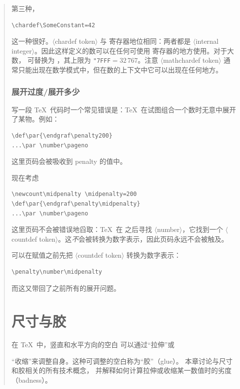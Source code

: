 \documentclass[a4paper]{rapport3}
\def\gr#1{$\langle$#1$\rangle$}\def\key#1{{\tt#1}}
\newenvironment{disp}{\begin{quotation}}{\end{quotation}}
\def\term#1\par{\index{#1}}
\begin{document}
\begin{disp}
第三种，
\begin{verbatim}
\chardef\SomeConstant=42
\end{verbatim}
这一种很好。\gr{chardef token} 与  寄存器地位相同：两者都是 \gr{internal integer}。因此这样定义的数可以在任何可使用  寄存器的地方使用。对于大数， 可替换为 ，其上限为 \verb>"7FFF>${}=32\,767$。注意 \gr{mathchardef token} 通常只能出现在数学模式中，但在数的上下文中它可以出现在任何地方。

\subsection{展开过度/展开多少}

写一段 \TeX\ 代码时一个常见错误是：\TeX\ 在试图组合一个数时无意中展开了某物。例如：
\begin{verbatim}
\def\par{\endgraf\penalty200}
...\par \number\pageno
\end{verbatim}
这里页码会被吸收到 penalty 的值中。

现在考虑
\begin{verbatim}
\newcount\midpenalty \midpenalty=200
\def\par{\endgraf\penalty\midpenalty}
...\par \number\pageno
\end{verbatim}
这里页码不会被错误地舀取：\TeX\ 在  之后寻找 \gr{number}，它找到一个 \gr{countdef token}。这{\em 不\/}会被转换为数字表示，因此页码永远不会被触及。

可以在赋值之前先把 \gr{countdef token} 转换为数字表示：
\begin{verbatim}
\penalty\number\midpenalty
\end{verbatim}
而这又带回了之前所有的展开问题。



\endofchapter
\chapter{尺寸与胶}\label{glue}

在 \TeX\ 中，竖直和水平方向的空白
可以通过“拉伸”或
\term 胶\par
“收缩”来调整自身。这种可调整的空白称为“胶”（glue）。
本章讨论与尺寸和胶相关的所有技术概念，
并解释如何计算拉伸或收缩某一数值时的劣度（badness）。



\end{disp}
\end{document}
